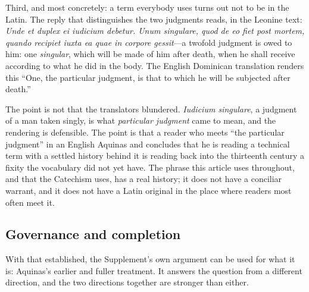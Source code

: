 Third, and most concretely: a term everybody uses turns out not to be in the Latin. The reply that distinguishes the two judgments reads, in the Leonine text: \emph{Unde et duplex ei iudicium debetur. Unum singulare, quod de eo fiet post mortem, quando recipiet iuxta ea quae in corpore gessit}---a twofold judgment is owed to him: one \emph{singular}, which will be made of him after death, when he shall receive according to what he did in the body. The English Dominican translation renders this ``One, the particular judgment, is that to which he will be subjected after death.''

The point is not that the translators blundered. \emph{Iudicium singulare}, a judgment of a man taken singly, is what \emph{particular judgment} came to mean, and the rendering is defensible. The point is that a reader who meets ``the particular judgment'' in an English Aquinas and concludes that he is reading a technical term with a settled history behind it is reading back into the thirteenth century a fixity the vocabulary did not yet have. The phrase this article uses throughout, and that the Catechism uses, has a real history; it does not have a conciliar warrant, and it does not have a Latin original in the place where readers most often meet it.

\subsection{Governance and completion}

With that established, the Supplement's own argument can be used for what it is: Aquinas's earlier and fuller treatment. It answers the question from a different direction, and the two directions together are stronger than either.

